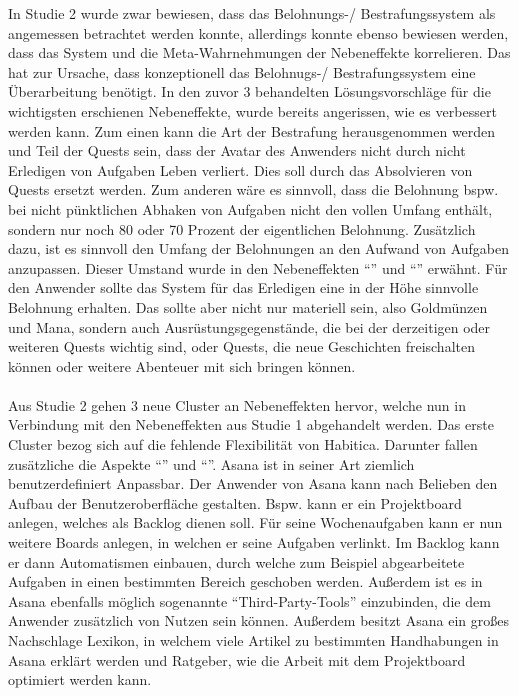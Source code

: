 \documentclass[sigconf, nonacm]{acmart}
\begin{document}
 In Studie 2 wurde zwar bewiesen, dass das Belohnungs-/ Bestrafungssystem als angemessen betrachtet werden konnte, allerdings konnte ebenso bewiesen werden, dass das System und die Meta-Wahrnehmungen der Nebeneffekte korrelieren. Das hat zur Ursache, dass konzeptionell das Belohnugs-/ Bestrafungssystem eine Überarbeitung benötigt. In den zuvor 3 behandelten Lösungsvorschläge für die wichtigsten erschienen Nebeneffekte, wurde bereits angerissen, wie es verbessert werden kann. Zum einen kann die Art der Bestrafung herausgenommen werden und Teil der Quests sein, dass der Avatar des Anwenders nicht durch nicht Erledigen von Aufgaben Leben verliert. Dies soll durch das Absolvieren von Quests ersetzt werden. Zum anderen wäre es sinnvoll, dass die Belohnung bspw. bei nicht pünktlichen Abhaken von Aufgaben nicht den vollen Umfang enthält, sondern nur noch 80 oder 70 Prozent der eigentlichen Belohnung. Zusätzlich dazu, ist es sinnvoll den Umfang der Belohnungen an den Aufwand von Aufgaben anzupassen. Dieser Umstand wurde in den Nebeneffekten \enquote{} und \enquote{} erwähnt. Für den Anwender sollte das System für das Erledigen eine in der Höhe sinnvolle Belohnung erhalten. Das sollte aber nicht nur materiell sein, also Goldmünzen und Mana, sondern auch Ausrüstungsgegenstände, die bei der derzeitigen oder weiteren Quests wichtig sind, oder Quests, die neue Geschichten freischalten können oder weitere Abenteuer mit sich bringen können.
 \\
 \\
Aus Studie 2 gehen 3 neue Cluster an Nebeneffekten hervor, welche nun in Verbindung mit den Nebeneffekten aus Studie 1 abgehandelt werden.
Das erste Cluster bezog sich auf die fehlende Flexibilität von Habitica. Darunter fallen zusätzliche die Aspekte \enquote{} und \enquote{}. Asana ist in seiner Art ziemlich benutzerdefiniert Anpassbar. Der Anwender von Asana kann nach Belieben den Aufbau der Benutzeroberfläche gestalten. Bspw. kann er ein Projektboard anlegen, welches als Backlog dienen soll. Für seine Wochenaufgaben kann er nun weitere Boards anlegen, in welchen er seine Aufgaben verlinkt. Im Backlog kann er dann Automatismen einbauen, durch welche zum Beispiel abgearbeitete Aufgaben in einen bestimmten Bereich geschoben werden. Außerdem ist es in Asana ebenfalls möglich sogenannte \enquote{Third-Party-Tools} einzubinden, die dem Anwender zusätzlich von Nutzen sein können. Außerdem besitzt Asana ein großes Nachschlage Lexikon, in welchem viele Artikel zu bestimmten Handhabungen in Asana erklärt werden und Ratgeber, wie die Arbeit mit dem Projektboard optimiert werden kann.
\end{document}
